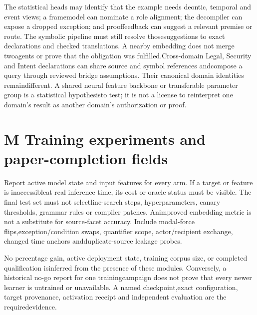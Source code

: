 
\noindent
The statistical heads may identify that the example needs deontic, temporal and event views; a frame\linebreak[4]
model can nominate a role alignment; the decompiler can expose a dropped exception; and proof\linebreak[4]
feedback can suggest a relevant premise or route. The symbolic pipeline must still resolve those\linebreak[4]
suggestions to exact declarations and checked translations. A nearby embedding does not merge two\linebreak[4]
agents or prove that the obligation was fulfilled.\linebreak[4]
Cross-domain Legal, Security and Intent declarations can share source and symbol references and\linebreak[4]
compose a query through reviewed bridge assumptions. Their canonical domain identities remain\linebreak[4]
different. A shared neural feature backbone or transferable parameter group is a statistical hypothesis\linebreak[4]
to test; it is not a license to reinterpret one domain's result as another domain's authorization or proof.\par

\section*{M  Training experiments and paper-completion fields}

\noindent
Report active model state and input features for every arm. If a target or feature is inaccessible\linebreak[4]
at real inference time, its cost or oracle status must be visible. The final test set must not select\linebreak[4]
line-search steps, hyperparameters, canary thresholds, grammar rules or compiler patches. An\linebreak[4]
improved embedding metric is not a substitute for source-facet accuracy. Include modal-force flips,\linebreak[4]
exception/condition swaps, quantifier scope, actor/recipient exchange, changed time anchors and\linebreak[4]
duplicate-source leakage probes.\par


\noindent
No percentage gain, active deployment state, training corpus size, or completed qualification is\linebreak[4]
inferred from the presence of these modules. Conversely, a historical no-go report for one training\linebreak[4]
campaign does not prove that every newer learner is untrained or unavailable. A named checkpoint,\linebreak[4]
exact configuration, target provenance, activation receipt and independent evaluation are the required\linebreak[4]
evidence.\par

